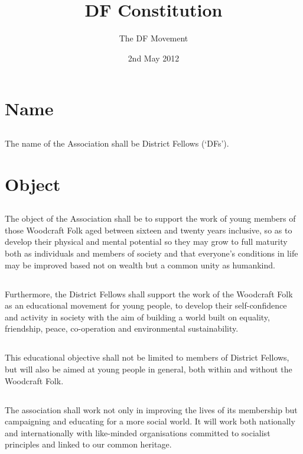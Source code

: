 \documentclass[a4paper, 12pt]{article}
\title{DF Constitution}
\author{The DF Movement}
\date{2nd May 2012}
\begin{document}
\maketitle
\tableofcontents

\section{Name}
\subsection{}
The name of the Association shall be District Fellows (`DFs').

\section{Object}
\subsection{}
The object of the Association shall be to support the work of young members of those Woodcraft Folk aged between sixteen and twenty years inclusive, so as to develop their physical and mental potential so they may grow to full maturity both as individuals and members of society and that everyone’s conditions in life may be improved based not on wealth but a common unity as humankind.
\subsection{}
Furthermore, the District Fellows shall support the work of the Woodcraft Folk as an educational movement for young people, to develop their self-confidence and activity in society with the aim of building a world built on equality, friendship, peace, co-operation and environmental sustainability. 
\subsection{}
This educational objective shall not be limited to members of District Fellows, but will also be aimed at young people in general, both within and without the Woodcraft Folk.
\subsection{}
The association shall work not only in improving the lives of its membership but campaigning and educating for a more social world. It will work both nationally and internationally with like-minded organisations committed to socialist principles and linked to our common heritage.
\end{document}
